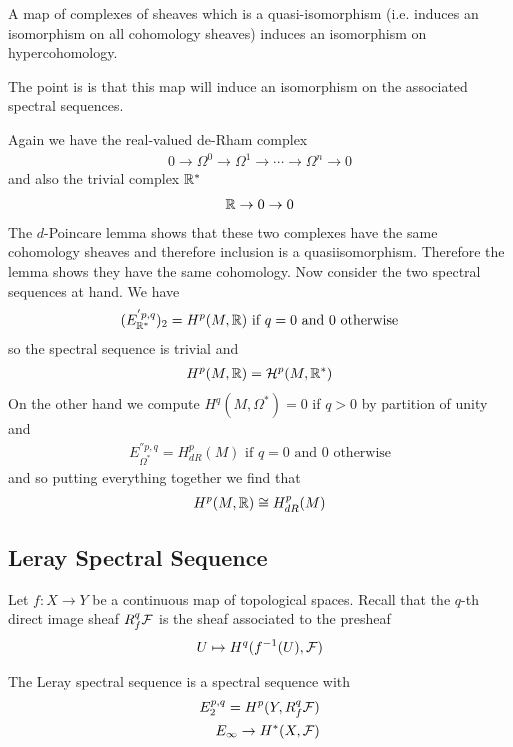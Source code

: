 \documentclass[12pt]{article}
\begin{document}
\begin{lemma}
    A map of complexes of sheaves which is a quasi-isomorphism
    (i.e. induces an isomorphism on all cohomology sheaves)
    induces an isomorphism on hypercohomology.
\end{lemma} The point is is that this map will induce an
isomorphism on the associated spectral sequences.
\begin{example}
    Again we have the real-valued de-Rham complex \begin{align*}
        0 \to \Omega^0 \to \Omega^1 \to \cdots \to \Omega^n \to 0
    \end{align*} and also the trivial complex $\mathbb{R}^*$ \begin{align*}
        \mathbb{R} \to 0 \to 0
    \end{align*} The $d$-Poincare lemma shows that these
    two complexes have the same cohomology sheaves and therefore inclusion
    is a quasiisomorphism. Therefore the lemma shows they have
    the same cohomology. Now consider the two
    spectral sequences at hand. We have \begin{align*}
        (E_{\mathbb{R}^*}^{'p,q})_2 = H^p(M,\mathbb{R}) \text{ if $q=0$} \text{ and } 0 \text{ otherwise}
    \end{align*} so the spectral sequence is trivial and \begin{align*}
        H^p(M,\mathbb{R}) = {\mathcal{H}}^p(M,\mathbb{R}^*)
    \end{align*} On the other hand we compute $H^q(M,\Omega^*)= 0$ if $q>0$ by
    partition of unity and
    \begin{align*}
        E_{\Omega^*}^{''p,q} = H^p_{dR}(M) \text{ if $q=0$} \text{ and } 0 \text{ otherwise}
    \end{align*} and so putting everything together we find that \begin{align*}
        H^p(M,\mathbb{R}) \cong H^p_{dR}(M)
    \end{align*}
\end{example}
\subsection{Leray Spectral Sequence}
Let $f:X\to Y$ be a continuous map of topological spaces. Recall
that the $q$-th direct image sheaf $R^q_f{\mathcal{F}}$ is the sheaf associated to the presheaf \begin{align*}
    U \mapsto H^q(f^{-1}(U),{\mathcal{F}})
\end{align*}

The Leray spectral sequence is a spectral sequence with \begin{align*}
    E_2^{p,q} = H^p(Y,R^q_f{\mathcal{F}}) \\
    E_\infty \to H^*(X,{\mathcal{F}})
\end{align*}
\end{document}
